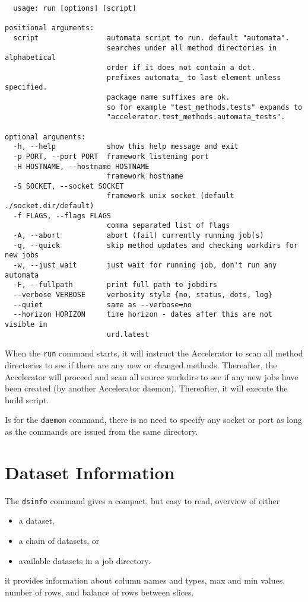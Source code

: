\begin{snugshade}
\begin{verbatim}
  usage: run [options] [script]

positional arguments:
  script                automata script to run. default "automata".
                        searches under all method directories in alphabetical
                        order if it does not contain a dot.
                        prefixes automata_ to last element unless specified.
                        package name suffixes are ok.
                        so for example "test_methods.tests" expands to
                        "accelerator.test_methods.automata_tests".

optional arguments:
  -h, --help            show this help message and exit
  -p PORT, --port PORT  framework listening port
  -H HOSTNAME, --hostname HOSTNAME
                        framework hostname
  -S SOCKET, --socket SOCKET
                        framework unix socket (default ./socket.dir/default)
  -f FLAGS, --flags FLAGS
                        comma separated list of flags
  -A, --abort           abort (fail) currently running job(s)
  -q, --quick           skip method updates and checking workdirs for new jobs
  -w, --just_wait       just wait for running job, don't run any automata
  -F, --fullpath        print full path to jobdirs
  --verbose VERBOSE     verbosity style {no, status, dots, log}
  --quiet               same as --verbose=no
  --horizon HORIZON     time horizon - dates after this are not visible in
                        urd.latest
\end{verbatim}
\end{snugshade}
When the \texttt{run} command starts, it will instruct the Accelerator
to scan all method directories to see if there are any new or changed
methods.  Thereafter, the Accelerator will proceed and scan all source
workdirs to see if any new jobs have been created (by another
Accelerator daemon).  Thereafter, it will execute the build script.

Is for the \texttt{daemon} command, there is no need to specify any
socket or port as long as the commands are issued from the same
directory.




\section{Dataset Information}
The \texttt{dsinfo} command gives a compact, but easy to read,
overview of either
\begin{itemize}
\item[] a dataset,
\item[] a chain of datasets, or
\item[] available datasets in a job directory.
\end{itemize}
it provides information about column names and types, max and min
values, number of rows, and balance of rows between slices.


